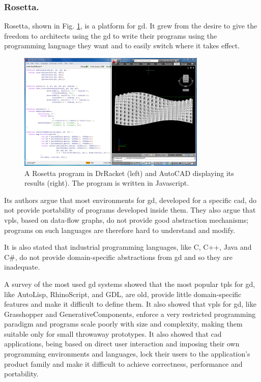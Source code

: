 \documentclass{./llncs2e/llncs}
\begin{document}
\subsubsection{Rosetta.}
	Rosetta\cite{de2012modern,lopes2011portable}, shown in Fig. \ref{fig:rosetta:ex}, is a platform for \ac{gd}.
	It grew from the desire to give the freedom to architects using the \ac{gd} to write their programs using the programming language they want and to easily switch where it takes effect.
	
	\begin{figure}
		\centering
		\includegraphics[width=0.8\textwidth]{img/rosetta_js_autocad}
		\caption{A Rosetta program in DrRacket (left) and AutoCAD displaying its results (right). The program is written in Javascript.}
		\label{fig:rosetta:ex}
	\end{figure} 
	
	Its authors argue that most environments for \ac{gd}, developed for a specific \ac{cad}, do not provide portability of programs developed inside them.
	They also argue that \ac{vpl}s, based on data-flow graphs, do not provide good abstraction mechanisms; programs on such languages are therefore hard to understand and modify.
	
	It is also stated that industrial programming languages, like C, C++, Java and C\#, do not provide domain-specific abstractions from \ac{gd} and so they are inadequate.
	
	A survey of the most used \ac{gd} systems showed that the most popular \ac{tpl}s for \ac{gd}, like AutoLisp, RhinoScript, and GDL, are old, provide little domain-specific features and make it difficult to define them\cite{de2012modern,leitao2012programming}.
	It also showed that \ac{vpl}s for \ac{gd}, like Grasshopper and GenerativeComponents, enforce a very restricted programming paradigm and programs scale poorly with size and complexity, making them suitable only for small throwaway prototypes. 
	It also showed that \ac{cad} applications, being based on direct user interaction and imposing their own programming environments and languages, lock their users to the application's product family and make it difficult to achieve correctness, performance and portability.
	
\end{document}
